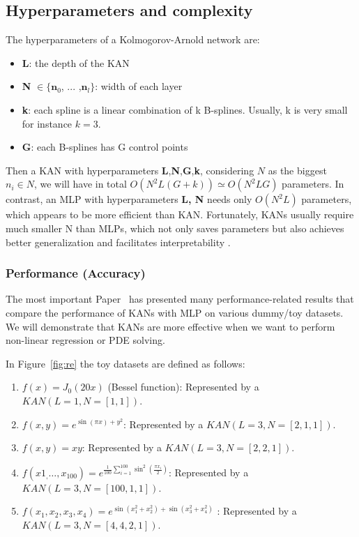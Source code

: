 \subsection{Hyperparameters and complexity}
The hyperparameters of a Kolmogorov-Arnold network are:
\begin{itemize}
    \item \textbf{L}: the depth of the KAN
    \item \textbf{N} $ \in \{\textbf{n}_0$, ... ,$\textbf{n}_l\}$: width of each layer
    \item \textbf{k}: each spline is a linear combination of k B-splines. Usually, k is very small for instance $k=3$.
    \item \textbf{G}: each B-splines has G control points
\end{itemize}

Then a KAN with hyperparameters \textbf{L},\textbf{N},\textbf{G},\textbf{k}, considering $N$ as the biggest $n_i \in N$, we will have in total $O(N^2L(G + k))  \simeq O(N^2LG)$ parameters. In contrast, an MLP with hyperparameters \textbf{L, N} needs only  $O(N^2L)$ parameters, which appears to be more efficient than KAN. Fortunately, KANs usually require much smaller N than MLPs, which not only saves parameters but also achieves better generalization and facilitates interpretability \cite{KAN}. 

\subsubsection{Performance (Accuracy)}
The most important Paper~\cite{KAN} has presented many performance-related results that compare the performance of KANs with MLP on various dummy/toy datasets. We will demonstrate that KANs are more effective when we want to perform non-linear regression or PDE solving.

In Figure~\ref{fig:re} the toy datasets are defined as follows:
\begin{enumerate}
    \item $f(x) = J_0(20x)$ (Bessel function): Represented by a $KAN(L=1,N=[1,1])$.
    \item $f(x, y) = e^{\sin(\pi x)+y^2}$: Represented by a $KAN(L=3,N=[2, 1, 1])$.
    \item $f(x, y) = xy$: Represented by a $KAN(L=3,N=[2, 2, 1])$.
    \item $f(x1_,\dots , x_{100}) = e^{\frac{1}{100} 
    \sum_{i=1}^{100} \sin^2(\frac{\pi x_i}{2})}$: Represented by a $KAN(L=3,N=[100, 1, 1])$.

    \item $f(x_1, x_2, x_3, x_4) = e^ {\sin(x_1^2 + x_2^2)+ \sin(x_3^2 + x_4^2)}$ : Represented by a $KAN(L=3,N=[4,4, 2, 1])$.
\end{enumerate}

